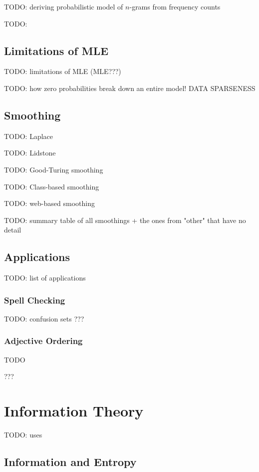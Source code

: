\documentclass{article}
\begin{document}
TODO: deriving probabilistic model of $n$-grams from frequency counts

TODO:

\subsection{Limitations of MLE}

TODO: limitations of MLE (MLE???)

TODO: how zero probabilities break down an entire model! DATA SPARSENESS

\subsection{Smoothing}

TODO: Laplace

TODO: Lidstone

TODO: Good-Turing smoothing

TODO: Class-based smoothing

TODO: web-based smoothing

TODO: summary table of all smoothings + the ones from "other" that have no detail

\subsection{Applications}

TODO: list of applications

\subsubsection{Spell Checking}

TODO: confusion sets
???

\subsubsection{Adjective Ordering}

TODO

???

\section{Information Theory}

TODO: uses

\subsection{Information and Entropy}
\end{document}
